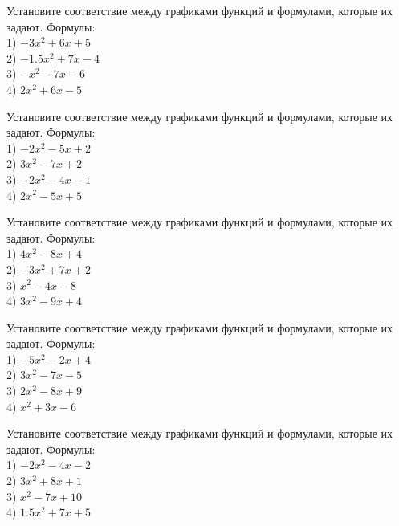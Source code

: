 \documentclass[4apaper]{article}
\begin{document}
\begin{taskBN}{93}
Установите соответствие между графиками функций и формулами, которые их задают. Формулы: \\1) $-3x^2+6x+5$\\2) $-1.5x^2+7x-4$\\3) $-x^2-7x-6$\\4) $2x^2+6x-5$
\end{taskBN}

\begin{taskBN}{94}
Установите соответствие между графиками функций и формулами, которые их задают. Формулы: \\1) $-2x^2-5x+2$\\2) $3x^2-7x+2$\\3) $-2x^2-4x-1$\\4) $2x^2-5x+5$
\end{taskBN}

\begin{taskBN}{95}
Установите соответствие между графиками функций и формулами, которые их задают. Формулы: \\1) $4x^2-8x+4$\\2) $-3x^2+7x+2$\\3) $x^2-4x-8$\\4) $3x^2-9x+4$
\end{taskBN}

\begin{taskBN}{96}
Установите соответствие между графиками функций и формулами, которые их задают. Формулы: \\1) $-5x^2-2x+4$\\2) $3x^2-7x-5$\\3) $2x^2-8x+9$\\4) $x^2+3x-6$
\end{taskBN}

\begin{taskBN}{97}
Установите соответствие между графиками функций и формулами, которые их задают. Формулы: \\1) $-2x^2-4x-2$\\2) $3x^2+8x+1$\\3) $x^2-7x+10$\\4) $1.5x^2+7x+5$
\end{taskBN}
\end{document}
